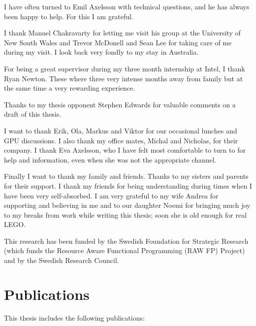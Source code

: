 \documentclass[a4paper]{book}
\begin{document}
I have often turned to Emil Axelsson with technical questions, and he has always been
happy to help. For this I am grateful. 

I thank Manuel Chakravarty for letting me visit his group at the University of New South Wales 
and Trevor McDonell and Sean Lee for taking care of me during my visit. I look back 
very fondly to my stay in Australia. 

For being a great supervisor during my three month internship at Intel, I thank Ryan Newton. 
These where three very intense months away from family but at the same time a very rewarding 
experience. 

Thanks to my thesis opponent Stephen Edwards for valuable comments on a draft of this thesis. 

I want to thank Erik, Ola, Markus and Viktor for our occasional lunches and GPU discussions. 
I also thank my office mates, Michal and Nicholas, for their company. I thank Eva Axelsson, 
who I have felt most comfortable to turn to for help and information, even when she was not 
the appropriate channel.

Finally I want to thank my family and friends. Thanks to my sisters and parents for their support.
I thank my friends for being understanding during times when I have been very self-absorbed. 
I am very grateful to my wife Andrea for supporting and believing in me and to our daughter Noemi 
for bringing much joy to my breaks from work while writing this thesis; soon she is old enough 
for real LEGO. 

\vspace{5mm}
\noindent This research has been funded by the Swedish Foundation for
Strategic Research (which funds the Resource Aware Functional 
Programming (RAW FP) Project) and by the Swedish Research Council.

\clearpage

\section*{Publications}

This thesis includes the following publications: 
\end{document}
